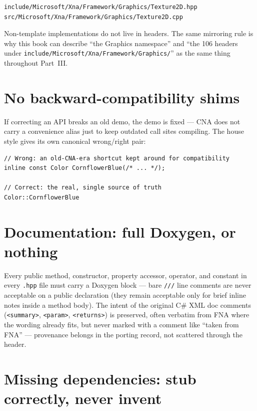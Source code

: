 \begin{lstlisting}
include/Microsoft/Xna/Framework/Graphics/Texture2D.hpp
src/Microsoft/Xna/Framework/Graphics/Texture2D.cpp
\end{lstlisting}

Non-template implementations do not live in headers. The same mirroring rule is why this
book can describe ``the Graphics namespace'' and ``the 106 headers under
\texttt{include/\allowbreak{}Microsoft/\allowbreak{}Xna/\allowbreak{}Framework/\allowbreak{}Graphics/}''
as the same thing throughout Part~III.

\section{No backward-compatibility shims}

If correcting an API breaks an old demo, the demo is fixed --- CNA does not carry a
convenience alias just to keep outdated call sites compiling. The house style gives its own
canonical wrong/right pair:

\begin{lstlisting}
// Wrong: an old-CNA-era shortcut kept around for compatibility
inline const Color CornflowerBlue(/* ... */);

// Correct: the real, single source of truth
Color::CornflowerBlue
\end{lstlisting}

\section{Documentation: full Doxygen, or nothing}

Every public method, constructor, property accessor, operator, and constant in every
\texttt{.hpp} file must carry a Doxygen block --- bare \texttt{///} line comments are never
acceptable on a public declaration (they remain acceptable only for brief inline notes inside
a method body). The intent of the original C\# XML doc comments (\texttt{<summary>},
\texttt{<param>}, \texttt{<returns>}) is preserved, often verbatim from FNA where the wording
already fits, but never marked with a comment like ``taken from FNA'' --- provenance belongs
in the porting record, not scattered through the header.

\section{Missing dependencies: stub correctly, never invent}
\label{sec:missing-deps}

